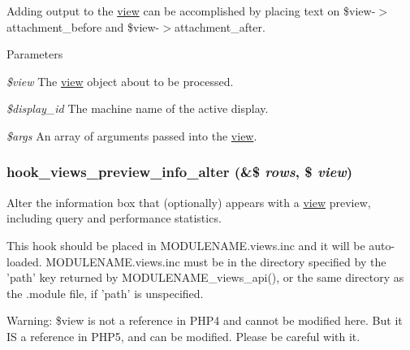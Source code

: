 Adding output to the \hyperlink{classview}{view} can be accomplished by placing text on \$view-\/$>$attachment\_\-before and \$view-\/$>$attachment\_\-after. 
\begin{DoxyParams}{Parameters}
\item[{\em \$view}]The \hyperlink{classview}{view} object about to be processed. \item[{\em \$display\_\-id}]The machine name of the active display. \item[{\em \$args}]An array of arguments passed into the \hyperlink{classview}{view}. \end{DoxyParams}
\hypertarget{group__views__hooks_gafeafa28dd3e140b2d4f8cfdfc7d76922}{
\subsubsection[{hook\_\-views\_\-preview\_\-info\_\-alter}]{\setlength{\rightskip}{0pt plus 5cm}hook\_\-views\_\-preview\_\-info\_\-alter (\&\$ {\em rows}, \/  \$ {\em view})}}
\label{group__views__hooks_gafeafa28dd3e140b2d4f8cfdfc7d76922}
Alter the information box that (optionally) appears with a \hyperlink{classview}{view} preview, including query and performance statistics.

This hook should be placed in MODULENAME.views.inc and it will be auto-\/loaded. MODULENAME.views.inc must be in the directory specified by the 'path' key returned by MODULENAME\_\-views\_\-api(), or the same directory as the .module file, if 'path' is unspecified.

Warning: \$view is not a reference in PHP4 and cannot be modified here. But it IS a reference in PHP5, and can be modified. Please be careful with it.



